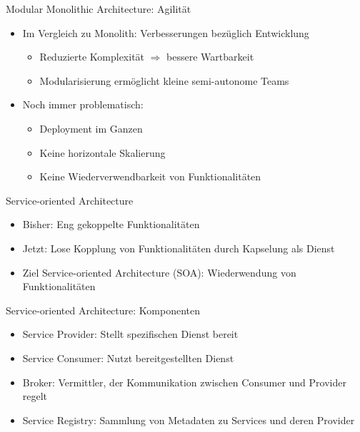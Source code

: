 \begin{frame}{Modular Monolithic Architecture: Agilität}
    \begin{itemize}
        \item Im Vergleich zu Monolith: Verbesserungen bezüglich Entwicklung
        \begin{itemize}
            \item Reduzierte Komplexität $\Rightarrow$ bessere Wartbarkeit
            \item Modularisierung ermöglicht kleine semi-autonome Teams
        \end{itemize}
        \item Noch immer problematisch:
        \begin{itemize}
            \item Deployment im Ganzen
            \item Keine horizontale Skalierung
            \item Keine Wiederverwendbarkeit von Funktionalitäten
        \end{itemize}
    \end{itemize}
\end{frame}


\begin{frame}{Service-oriented Architecture}
    \begin{itemize}
        \item Bisher: Eng gekoppelte Funktionalitäten
        \item Jetzt: Lose Kopplung von Funktionalitäten durch Kapselung als Dienst
        \item Ziel Service-oriented Architecture (SOA): Wiederwendung von Funktionalitäten
    \end{itemize}
\end{frame}

\begin{frame}{Service-oriented Architecture: Komponenten}
    \begin{itemize}
        \item Service Provider: Stellt spezifischen Dienst bereit
        \item Service Consumer: Nutzt bereitgestellten Dienst
        \item Broker: Vermittler, der Kommunikation zwischen Consumer und Provider regelt
        \item Service Registry: Sammlung von Metadaten zu Services und deren Provider
    \end{itemize}
\end{frame}

